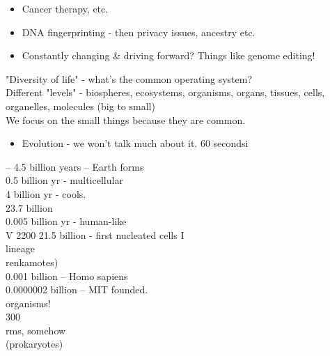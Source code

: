 \documentclass{article}
\begin{document}
\begin{itemize}
\item  Cancer therapy, etc.
\item  DNA fingerprinting - then privacy issues, ancestry etc.
\item  Constantly changing \& driving forward? Things like genome editing!
\end{itemize}
"Diversity of life" - what's the common operating system?\\
Different "levels" - biospheres, ecosystems, organisms, organs, tissues, cells,\\
organelles, molecules (big to small)\\
We focus on the small things because they are common.
\begin{itemize}
\item  Evolution - we won't talk much about it. 60 secondsi
\end{itemize}
– 4.5 billion years – Earth forms\\
0.5 billion yr - multicellular\\
4 billion yr - cools.\\
23.7 billion\\
0.005 billion yr - human-like\\
V 2200 21.5 billion - first nucleated cells I\\
lineage\\
renkamotes)\\
0.001 billion – Homo sapiens\\
0.0000002 billion – MIT founded.\\
organisms!\\
300\\
rms, somehow\\
(prokaryotes)\\
\end{document}

